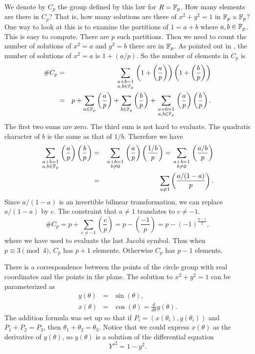 We denote by $C_p$ the group defined by this law for $R = \mathbb{F}_p$.  How
many elements are there in $C_p$?  That is, how many solutions are
there of $x^2 + y^2 =1$ in $\mathbb{F}_p \times \mathbb{F}_p$?  One way to look at
this is to examine the partitions of $1 = a + b$ where $a, b \in
\mathbb{F}_p$.  This is easy to compute.  There are $p$ such partitions.  Then
we need to count the number of solutions of $x^2 = a$ and $y^2 = b$
there are in $\mathbb{F}_p$.  As pointed out in , the
number of solutions of $x^2 = a$ is $1 + (a/p)$.  So the number of
elements in $C_p$ is
\begin{eqnarray*}
\# C_p &=& \sum_{\scriptstyle a + b = 1 \atop \scriptstyle a, b
\in \mathbb{F}_p}
\left( 1 + \left(\frac{a}{p} \right) \right)
\left( 1 + \left(\frac{b}{p} \right) \right) \\
&= &p + \sum_{a \in \mathbb{F}_p} \left(\frac{a}{p} \right)
+ \sum_{b \in \mathbb{F}_p} \left(\frac{b}{p} \right)
+ \sum_{\scriptstyle a + b = 1 \atop \scriptstyle a, b \in \mathbb{F}_p}
\left(\frac{a}{p} \right) \left(\frac{b}{p} \right).
\end{eqnarray*}
The first two sums are zero.  The third sum is not hard to evaluate.
The quadratic character of $b$ is the same as that of $1/b$.  Therefore
we have
\begin{eqnarray*}
\sum_{\scriptstyle a + b = 1 \atop \scriptstyle a, b \in \mathbb{F}_p}
\left(\frac{a}{p} \right) \left(\frac{b}{p} \right) &= &
\sum_{\scriptstyle a + b = 1 \atop \scriptstyle b \not= 0}
\left(\frac{a}{p} \right) \left(\frac{1/b}{p} \right) = 
\sum_{\scriptstyle a + b = 1 \atop \scriptstyle b \not= 0}
\left(\frac{a/b}{p} \right)\\
&=& \sum_{a \not= 1} \left(\frac{a/(1- a)}{p }\right).
\end{eqnarray*}
Since $a/(1- a)$ is an invertible bilinear transformation, we can replace
$a/(1- a)$ by $c$.  The constraint that $a\not= 1$ translates to
$c\not= -1$.
\[
\# C_p = p + \sum_{c \not = -1} \left(\frac{c}{p} \right) 
= p - \left(\frac{-1}{p}\right) = p - (-1)^{\frac{p -1}{2}},
\]
where we have used  to evaluate the
last Jacobi symbol.  Thus when $p \equiv 3 \pmod 4$, $C_p$ has $p+1$
elements.  Otherwise $C_p$ has $p-1$ elements.

\medskip
There is a correspondence between the points of the circle group with
real coordinates and the points in the plane. The solution to $x^2 + y^2
= 1$ can be parameterized as
\begin{eqnarray*}
y(\theta) &= &\sin(\theta),\\
x(\theta) &= &\cos(\theta) = \frac{d}{d\theta} y(\theta).
\end{eqnarray*}
The addition formula was set up so that if
$P_i = (x(\theta_i), y(\theta_i))$ and
$P_1 + P_2 = P_3$, then $\theta_1 + \theta_2 = \theta_3$.
Notice that we could express $x(\theta)$ as the derivative of
$y(\theta)$, so $y(\theta)$ is a solution of the differential equation
\[
Y'^2 = 1 -y^2.
\]

